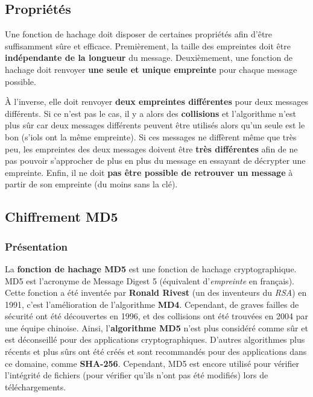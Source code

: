 \documentclass[12pt, a4paper]{article}
\begin{document}
\subsection*{Propriétés}
Une fonction de hachage doit disposer de certaines propriétés afin d'être suffisamment sûre et efficace.
Premièrement, la taille des empreintes doit être \textbf{indépendante de la longueur} du message.
Deuxièmement, une fonction de hachage doit renvoyer \textbf{une seule et unique empreinte} pour chaque message possible.

À l'inverse, elle doit renvoyer \textbf{deux empreintes différentes} pour deux messages différents.
Si ce n'est pas le cas, il y a alors des \textbf{collisions} et l'algorithme n'est plus sûr
car deux messages différents peuvent être utilisés alors qu'un seule est le bon (s'iols ont la même empreinte).
Si ces messages ne diffèrent même que très peu, les empreintes des deux messages doivent être \textbf{très différentes}
 afin de ne pas pouvoir s'approcher de plus en plus du message en essayant de décrypter une empreinte.
Enfin, il ne doit \textbf{pas être possible de retrouver un message} à partir de son empreinte (du moins sans la clé).

\subsection{Chiffrement MD5}

\subsubsection*{Présentation}

La \textbf{fonction de hachage MD5} est une fonction de hachage cryptographique.
MD5 est l'acronyme de Message Digest 5 (équivalent d'\textit{empreinte} en français).
Cette fonction a été inventée par \textbf{Ronald Rivest} (un des inventeurs du \textit{RSA}) en 1991,
c'est l'amélioration de l'algorithme \textbf{MD4}.
Cependant, de graves failles de sécurité ont été découvertes en 1996,
et des collisions ont été trouvées en 2004 par une équipe chinoise.
Ainsi, l'\textbf{algorithme MD5} n'est plus considéré comme sûr et est déconseillé pour des applications cryptographiques.
D'autres algorithmes plus récents et plus sûrs ont été créés et sont recommandés pour des applications dans ce domaine,
comme \textbf{SHA-256}.
Cependant, MD5 est encore utilisé pour vérifier l'intégrité de fichiers (pour vérifier qu'ils n'ont pas été modifiés)
lors de téléchargements.
\end{document}
